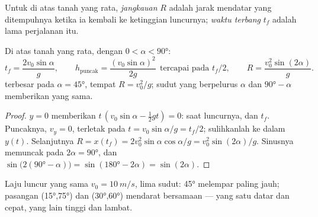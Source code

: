 \begin{definition}[Jangkauan]\label{def:g12:projectile-motion:range}
Untuk  di atas tanah yang rata, \emph{jangkauan} $R$
adalah jarak mendatar yang ditempuhnya ketika ia kembali ke ketinggian
luncurnya; \emph{waktu terbang} $t_f$ adalah lama perjalanan itu.
\end{definition}

\begin{proposition}\label{prop:g12:projectile-motion:range}
Di atas tanah yang rata, dengan $0 < \alpha < \ang{90}$:
\[
t_f = \frac{2 v_0 \sin\alpha}{g}, \qquad
h_{\text{puncak}} = \frac{(v_0\sin\alpha)^2}{2g}
\ \ \text{tercapai pada } t_f/2, \qquad
R = \frac{v_0^2 \sin(2\alpha)}{g}.
\]
 terbesar pada $\alpha = \ang{45}$, tempat $R = v_0^2/g$;
sudut yang berpelurus $\alpha$ dan $\ang{90} - \alpha$ memberikan  yang sama.
\end{proposition}

\begin{proof}
$y = 0$ memberikan $t\,(v_0\sin\alpha - \tfrac12 gt) = 0$: saat luncurnya, dan $t_f$.
Puncaknya, $v_y = 0$, terletak pada $t = v_0\sin\alpha/g = t_f/2$; sulihkanlah ke dalam
$y(t)$. Selanjutnya $R = x(t_f) = 2v_0^2\sin\alpha\cos\alpha/g =
v_0^2\sin(2\alpha)/g$. Sinusnya memuncak pada $2\alpha = \ang{90}$, dan
$\sin\bigl(2(\ang{90}-\alpha)\bigr) = \sin(\ang{180} - 2\alpha) =
\sin(2\alpha)$.
\end{proof}

\begin{omfigure}

{\small Laju luncur yang sama $v_0 = \qty{10}{m/s}$, lima sudut: \ang{45}
melempar paling jauh; pasangan (\ang{15},\ang{75}) dan (\ang{30},\ang{60})
mendarat bersamaan --- yang satu datar dan cepat, yang lain tinggi dan lambat.}
\end{omfigure}

